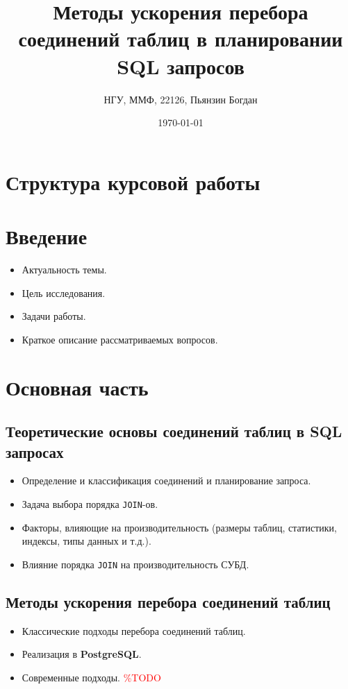 \documentclass[12pt]{article}
\title{Методы ускорения перебора соединений таблиц в планировании SQL запросов}
\author{НГУ, ММФ, 22126, Пьянзин Богдан}
\date{\today}
\begin{document}
\maketitle

\newpage


\section*{Структура курсовой работы}  %

\section{Введение}
\begin{itemize}
    \item Актуальность темы.
    \item Цель исследования.
    \item Задачи работы.
    \item Краткое описание рассматриваемых вопросов.
\end{itemize}

\section{Основная часть}

\subsection{Теоретические основы соединений таблиц в \textbf{SQL} запросах}
\begin{itemize}
    \item Определение и классификация соединений и планирование запроса.
    \item Задача выбора порядка \texttt{JOIN}-ов.
    \item Факторы, влияющие на производительность (размеры таблиц, статистики, индексы, типы данных и т.д.).
    \item Влияние порядка \texttt{JOIN} на производительность СУБД.
\end{itemize}

\subsection{Методы ускорения перебора соединений таблиц}
\begin{itemize}
    \item Классические подходы перебора соединений таблиц.
    \item Реализация в \textbf{PostgreSQL}.
    \item Современные подходы. \textcolor{red}{\%TODO}
\end{itemize}
\end{document}
